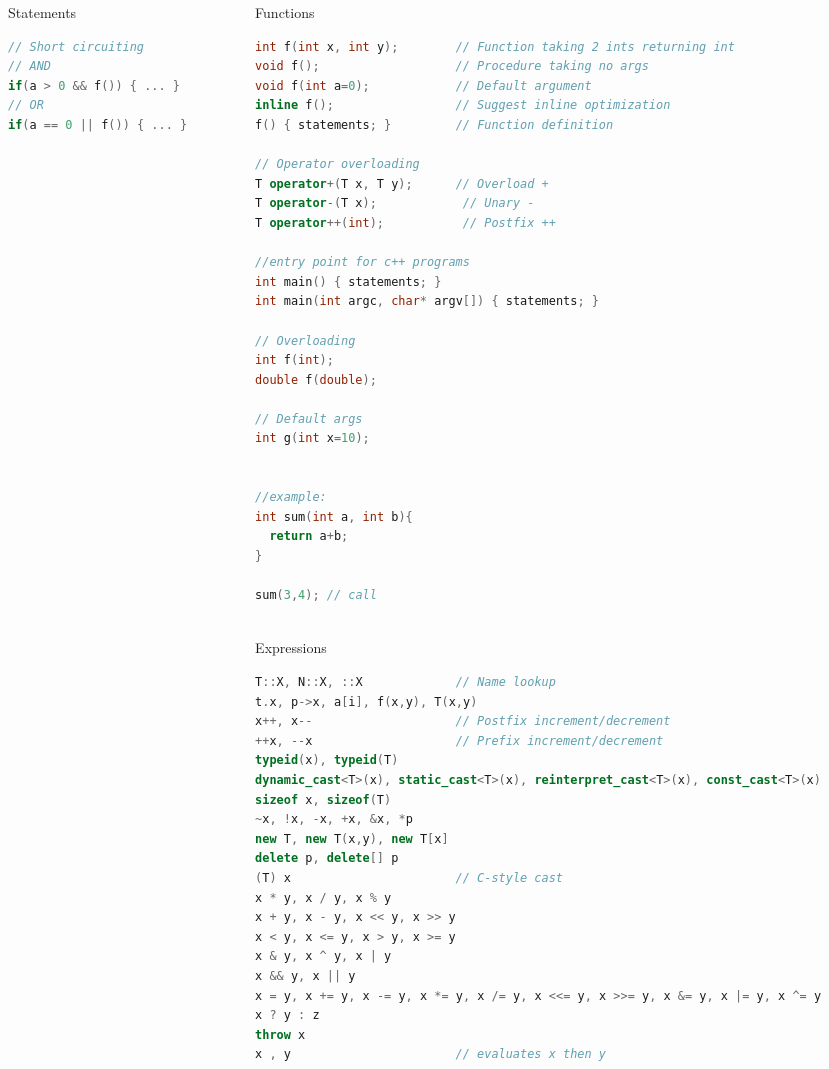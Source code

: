 \documentclass[final]{beamer}
\begin{document}
\begin{frame}[t,fragile]
\begin{columns}[t,totalwidth=0.95\paperwidth, colsep=0.05\paperwidth]
\begin{column}{0.3\paperwidth}
\begin{block}{Statements}
\begin{lstlisting}[language=C++]
// Short circuiting
// AND
if(a > 0 && f()) { ... }
// OR
if(a == 0 || f()) { ... }
\end{lstlisting}

\end{block}
\end{column}


\begin{column}{0.3\paperwidth}


\begin{block}{Functions}
\begin{lstlisting}[language=C++]
int f(int x, int y);        // Function taking 2 ints returning int
void f();                   // Procedure taking no args
void f(int a=0);            // Default argument
inline f();                 // Suggest inline optimization
f() { statements; }         // Function definition

// Operator overloading
T operator+(T x, T y);      // Overload +
T operator-(T x);            // Unary -
T operator++(int);           // Postfix ++

//entry point for c++ programs
int main() { statements; }     
int main(int argc, char* argv[]) { statements; } 

// Overloading
int f(int);
double f(double);

// Default args
int g(int x=10);


//example:
int sum(int a, int b){
  return a+b;
}

sum(3,4); // call



\end{lstlisting}
\end{block}




\begin{block}{Expressions}
\begin{lstlisting}[language=C++]
T::X, N::X, ::X             // Name lookup
t.x, p->x, a[i], f(x,y), T(x,y)
x++, x--                    // Postfix increment/decrement
++x, --x                    // Prefix increment/decrement
typeid(x), typeid(T)
dynamic_cast<T>(x), static_cast<T>(x), reinterpret_cast<T>(x), const_cast<T>(x)
sizeof x, sizeof(T)
~x, !x, -x, +x, &x, *p
new T, new T(x,y), new T[x]
delete p, delete[] p
(T) x                       // C-style cast
x * y, x / y, x % y
x + y, x - y, x << y, x >> y
x < y, x <= y, x > y, x >= y
x & y, x ^ y, x | y
x && y, x || y
x = y, x += y, x -= y, x *= y, x /= y, x <<= y, x >>= y, x &= y, x |= y, x ^= y
x ? y : z
throw x
x , y                       // evaluates x then y
\end{lstlisting}
\end{block}


\end{column}
\end{columns}
\end{frame}
\end{document}
